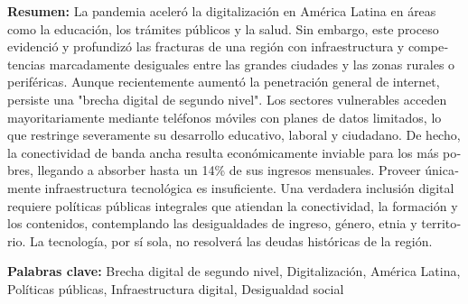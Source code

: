 \documentclass{article}
\begin{document}
\begin{tcolorbox}[colback=brown!8!white,colframe=brown!8!white,boxrule=0pt,arc=2pt,left=4pt,right=4pt,top=3pt,bottom=3pt,before skip=4pt,after skip=4pt]
\begin{otherlanguage}{spanish}
\sffamily\small \textbf{Resumen:} La pandemia aceleró la digitalización en América Latina en áreas como la educación, los trámites públicos y la salud. Sin embargo, este proceso evidenció y profundizó las fracturas de una región con infraestructura y competencias marcadamente desiguales entre las grandes ciudades y las zonas rurales o periféricas.
Aunque recientemente aumentó la penetración general de internet, persiste una "brecha digital de segundo nivel". Los sectores vulnerables acceden mayoritariamente mediante teléfonos móviles con planes de datos limitados, lo que restringe severamente su desarrollo educativo, laboral y ciudadano. De hecho, la conectividad de banda ancha resulta económicamente inviable para los más pobres, llegando a absorber hasta un 14\% de sus ingresos mensuales.
Proveer únicamente infraestructura tecnológica es insuficiente. Una verdadera inclusión digital requiere políticas públicas integrales que atiendan la conectividad, la formación y los contenidos, contemplando las desigualdades de ingreso, género, etnia y territorio. La tecnología, por sí sola, no resolverá las deudas históricas de la región.
\par\smallskip\noindent\textbf{Palabras clave:} Brecha digital de segundo nivel, Digitalización, América Latina, Políticas públicas, Infraestructura digital, Desigualdad social
\end{otherlanguage}
\end{tcolorbox}
\end{document}
